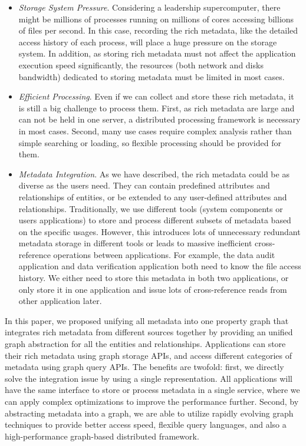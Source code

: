 \begin{itemize}

\item \textit{Storage System Pressure}. Considering a leadership supercomputer, there might be millions of processes running on millions of cores accessing billions of files per second. In this case, recording the rich metadata, like the detailed access history of each process, will place a huge pressure on the storage system. In addition, as storing rich metadata must not affect the application execution speed significantly, the resources (both network and disks bandwidth) dedicated to storing metadata must be limited in most cases.

\item \textit{Efficient Processing}. Even if we can collect and store these rich metadata, it is still a big challenge to process them. First, as rich metadata are large and can not be held in one server, a distributed processing framework is necessary in most cases. Second, many use cases require complex analysis rather than simple searching or loading, so flexible processing should be provided for them.

\item \textit{Metadata Integration}. As we have described, the rich metadata could be as diverse as the users need. They can contain predefined attributes and relationships of entities, or be extended to any user-defined attributes and relationships. Traditionally, we use different tools (system components or users applications) to store and process different subsets of metadata based on the specific usages. However, this introduces lots of unnecessary redundant metadata storage in different tools or leads to massive inefficient cross-reference operations between applications. For example, the data audit application and data verification application both need to know the file access history. We either need to store this metadata in both two applications, or only store it in one application and issue lots of cross-reference reads from other application later. 

\end{itemize}

In this paper, we proposed unifying all metadata into one property graph that integrates rich metadata from different sources together by providing an unified graph abstraction for all the entities and relationships. Applications can store their rich metadata using graph storage APIs, and access different categories of metadata using graph query APIs. The benefits are twofold: first, we directly solve the integration issue by using a single representation. All applications will have the same interface to store or process metadata in a single service, where we can apply complex optimizations to improve the performance further. Second, by abstracting metadata into a graph, we are able to utilize rapidly evolving graph techniques to provide better access speed, flexible query languages, and also a high-performance graph-based distributed framework. 

